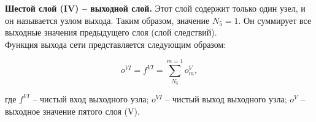 \documentclass{article}
\begin{document}
  {
    \indent\indent \textbf{Шестой слой (IV) -- выходной слой.} Этот слой содержит только один узел, и он называется узлом выхода. 
    Таким образом, значение $N_5=1$. Он суммирует все выходные значения предыдущего слоя (слой следствий).\\
    \indent\indent Функция выхода сети представляется следующим образом:
  }
  \begin{center}
    $$o^{VI}=f^{VI}=\sum_{N_5}^{m=1} o_m^V,$$
  \end{center}
  {
    где $f^{VI}$ -- чистый вход выходного узла; $o^{VI}$ -- чистый выход выходного узла; $o^V$ -- выходное значение пятого слоя (V).
  }


\end{document}
